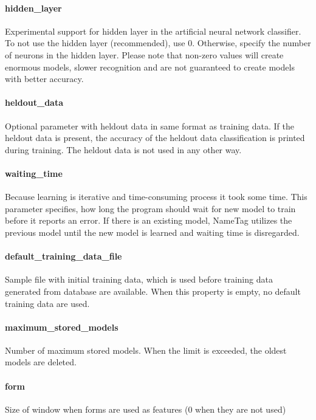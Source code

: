 \paragraph{hidden\_layer}
Experimental support for hidden layer in the artificial neural network classifier.
To not use the hidden layer (recommended), use 0. Otherwise, specify the number
of neurons in the hidden layer. Please note that non-zero values will create
enormous models, slower recognition and are not guaranteed to create models with
better accuracy.

\paragraph{heldout\_data}
Optional parameter with heldout data in same format as training data. If the heldout data
is present, the accuracy of the heldout data classification is printed during
training. The heldout data is not used in any other way.

\paragraph{waiting\_time}
Because learning is iterative and time-consuming process it took some time.
This parameter specifies, how long the program should wait for new model to
train before it reports an error. If there is an existing model, NameTag
utilizes the previous model until the new model is learned and waiting time is
disregarded.

\paragraph{default\_training\_data\_file}
Sample file with initial training data, which is used before training data
generated from database are available. When this property is empty, no default
training data are used.

\paragraph{maximum\_stored\_models}
Number of maximum stored models. When the limit is exceeded, the oldest models
are deleted.

\paragraph{form}
Size of window when forms are used as features (0 when they are not used)

